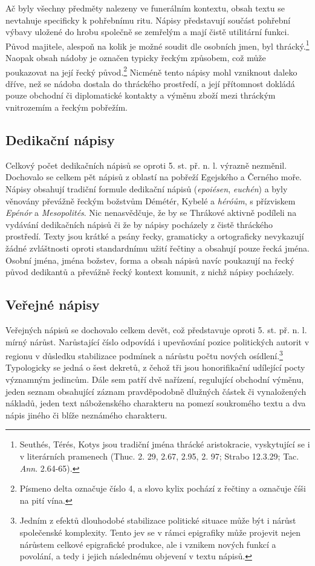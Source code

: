Ač byly všechny předměty nalezeny ve funerálním kontextu, obsah textu se nevtahuje specificky k pohřebnímu ritu. Nápisy představují součást pohřební výbavy uložené do hrobu společně se zemřelým a mají čistě utilitární funkci. Původ majitele, alespoň na kolik je možné soudit dle osobních jmen, byl thrácký.\footnote{Seuthés, Térés, Kotys jsou tradiční jména thrácké aristokracie, vyskytující se i v literárních pramenech (Thuc. 2. 29, 2.67, 2.95, 2. 97; Strabo 12.3.29; Tac. {\em Ann}. 2.64-65).} Naopak obsah nádoby je označen typicky řeckým způsobem, což může poukazovat na její řecký původ.\footnote{Písmeno delta označuje číslo 4, a slovo kylix pochází z řečtiny a označuje číši na pití vína.} Nicméně tento nápisy mohl vzniknout daleko dříve, než se nádoba dostala do thráckého prostředí, a její přítomnost dokládá pouze obchodní či diplomatické kontakty a výměnu zboží mezi thráckým vnitrozemím a řeckým pobřežím.

\subsection[dedikační-nápisy-3]{Dedikační nápisy}

Celkový počet dedikačních nápisů se oproti 5. st. př. n. l. výrazně nezměnil. Dochovalo se celkem pět nápisů z oblastí na pobřeží Egejského a Černého moře. Nápisy obsahují tradiční formule dedikační nápisů ({\em epoiésen}, {\em euchén}) a byly věnovány převážně řeckým božstvům Démétér, Kybelé a {\em héróům}, s přízviskem {\em Epénór} a {\em Mesopolités}. Nic nenasvědčuje, že by se Thrákové aktivně podíleli na vydávání dedikačních nápisů či že by nápisy pocházely z čistě thráckého prostředí. Texty jsou krátké a psány řecky, gramaticky a ortograficky nevykazují žádné zvláštnosti oproti standardnímu užití řečtiny a obsahují pouze řecká jména. Osobní jména, jména božstev, forma a obsah nápisů navíc poukazují na řecký původ dedikantů a převážně řecký kontext komunit, z nichž nápisy pocházely.

\subsection[veřejné-nápisy-3]{Veřejné nápisy}

Veřejných nápisů se dochovalo celkem devět, což představuje oproti 5. st. př. n. l. mírný nárůst. Narůstající číslo odpovídá i upevňování pozice politických autorit v regionu v důsledku stabilizace podmínek a nárůstu počtu nových osídlení.\footnote{Jedním z efektů dlouhodobé stabilizace politické situace může být i nárůst společenské komplexity. Tento jev se v rámci epigrafiky může projevit nejen nárůstem celkové epigrafické produkce, ale i vznikem nových funkcí a povolání, a tedy i jejich následnému objevení v textu nápisů.} Typologicky se jedná o šest dekretů, z čehož tři jsou honorifikační udílející pocty významným jedincům. Dále sem patří dvě nařízení, regulující obchodní výměnu, jeden seznam obsahující záznam pravděpodobně dlužných částek či vynaložených nákladů, jeden text náboženského charakteru na pomezí soukromého textu a dva nápis jiného či blíže neznámého charakteru.

